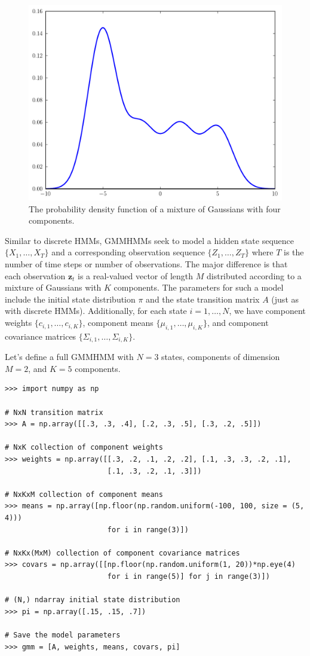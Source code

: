 \begin{figure}
\centering
\includegraphics[width=\textwidth]{figures/mixture.pdf}
\caption{The probability density function of a mixture of Gaussians with four components.}
\label{fig:mixture}
\end{figure}


Similar to discrete HMMs, GMMHMMs seek to model a hidden state sequence $\{X_1,\ldots, X_T\}$ and a corresponding observation sequence $\{Z_1,\ldots,Z_T\}$ where $T$ is the number of time steps or number of observations.
The major difference is that each observation $\mathbf{z}_t$ is a real-valued vector of length $M$ distributed according to a mixture of Gaussians with $K$ components.
The parameters for such a model include the initial state distribution $\pi$ and the state transition matrix $A$ (just as with discrete HMMs).
Additionally, for each state $i=1,\ldots,N$, we have component weights $\{c_{i,1},\ldots,c_{i,K}\}$, component means $\{\mu_{i,1},\ldots,\mu_{i,K}\}$, and component covariance matrices
$\{\Sigma_{i,1},\ldots,\Sigma_{i,K}\}$.

Let's define a full GMMHMM with $N=3$ states, components of dimension $M = 2$, and $K=5$ components.
\begin{lstlisting}
>>> import numpy as np

# NxN transition matrix 
>>> A = np.array([[.3, .3, .4], [.2, .3, .5], [.3, .2, .5]])

# NxK collection of component weights
>>> weights = np.array([[.3, .2, .1, .2, .2], [.1, .3, .3, .2, .1], 
                        [.1, .3, .2, .1, .3]])

# NxKxM collection of component means
>>> means = np.array([np.floor(np.random.uniform(-100, 100, size = (5, 4))) 
                        for i in range(3)])

# NxKx(MxM) collection of component covariance matrices       
>>> covars = np.array([[np.floor(np.random.uniform(1, 20))*np.eye(4) 
                        for i in range(5)] for j in range(3)])

# (N,) ndarray initial state distribution 
>>> pi = np.array([.15, .15, .7])

# Save the model parameters 
>>> gmm = [A, weights, means, covars, pi]
\end{lstlisting}

